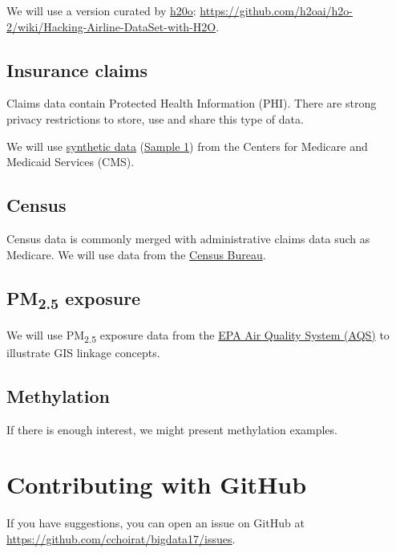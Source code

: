 \documentclass[]{book}
\theoremstyle{definition}
\theoremstyle{definition}
\theoremstyle{definition}
\theoremstyle{remark}
\begin{document}
We will use a version curated by \href{https://www.h2o.ai/}{h20o}:
\url{https://github.com/h2oai/h2o-2/wiki/Hacking-Airline-DataSet-with-H2O}.

\subsection{Insurance claims}\label{insurance-claims}

Claims data contain Protected Health Information (PHI). There are strong
privacy restrictions to store, use and share this type of data.

We will use
\href{https://www.cms.gov/Research-Statistics-Data-and-Systems/Downloadable-Public-Use-Files/SynPUFs/DE_Syn_PUF.html}{synthetic
data}
(\href{https://www.cms.gov/Research-Statistics-Data-and-Systems/Downloadable-Public-Use-Files/SynPUFs/DESample01.html}{Sample
1}) from the Centers for Medicare and Medicaid Services (CMS).

\subsection{Census}\label{census}

Census data is commonly merged with administrative claims data such as
Medicare. We will use data from the
\href{https://www.census.gov/data.html}{Census Bureau}.

\subsection{\texorpdfstring{PM\textsubscript{2.5}
exposure}{PM2.5 exposure}}\label{pm2.5-exposure}

We will use PM\textsubscript{2.5} exposure data from the
\href{https://www.epa.gov/aqs}{EPA Air Quality System (AQS)} to
illustrate GIS linkage concepts.

\subsection{Methylation}\label{methylation}

If there is enough interest, we might present methylation examples.

\section{Contributing with GitHub}\label{contributing-with-github}

If you have suggestions, you can open an issue on GitHub at
\url{https://github.com/cchoirat/bigdata17/issues}.
\end{document}
